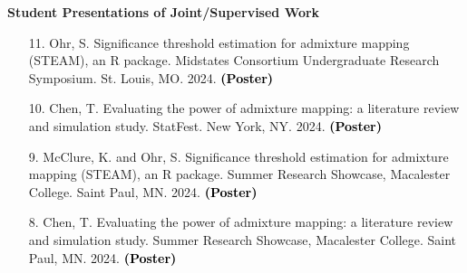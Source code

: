 \documentclass[margin]{res}
\newcommand{\annotate}[1]{\textcolor{black}{\textbf{(#1)}}}
\newcommand{\annotateItem}[1]{
	\begin{itemize} \vspace{-0.1cm}
	\item[] 
	\begin{footnotesize}\textcolor{black}{(#1)}\end{footnotesize}
	\end{itemize} \vspace{-0.1cm}
}
\begin{document}
\begin{resume}
\begin{itemize}

\end{itemize}



\textbf{Student Presentations of Joint/Supervised Work}

\begin{itemize}


\item[11.] Ohr, S. 
Significance threshold estimation for admixture mapping (STEAM), an R package. 
Midstates Consortium Undergraduate Research Symposium. St. Louis, MO. 2024. 
\annotate{Poster}

\item[10.] Chen, T. 
Evaluating the power of admixture mapping: a literature review and simulation study. 
StatFest. New York, NY. 2024. 
\annotate{Poster}

\item[9.] McClure, K. and Ohr, S. 
Significance threshold estimation for admixture mapping (STEAM), an R package. 
Summer Research Showcase, Macalester College. Saint Paul, MN. 2024. 
\annotate{Poster}%

\item[8.] Chen, T. 
Evaluating the power of admixture mapping: a literature review and simulation study. 
Summer Research Showcase, Macalester College. Saint Paul, MN. 2024. 
\annotate{Poster}




\end{itemize}
\end{resume}
\end{document}
